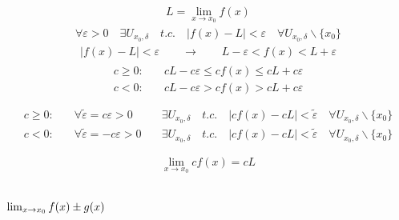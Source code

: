 \documentclass[letterpaper,10pt,italian]{jupyterBook}
\begin{document}
\begin{equation*}
\begin{split}L = \lim_{x \rightarrow x_0} f(x)\end{split}
\end{equation*}\begin{equation*}
\begin{split}\forall \varepsilon > 0 \quad \exists U_{x_0,\delta} \quad t.c. \quad |f(x) - L| < \varepsilon \quad \forall U_{x_0,\delta} \backslash \{x_0\} \end{split}
\end{equation*}\begin{equation*}
\begin{split}|f(x) - L| < \varepsilon \qquad \rightarrow \qquad L - \varepsilon < f(x) < L + \varepsilon\end{split}
\end{equation*}\begin{equation*}
\begin{split}\begin{aligned}
c \ge 0: & \quad  c L - c \varepsilon \le c f(x) \le c L + c \varepsilon \\
c  <  0: & \quad  c L - c \varepsilon   > c f(x)   > c L + c \varepsilon \\
\end{aligned}\end{split}
\end{equation*}\begin{equation*}
\begin{split}\begin{aligned}
c \ge 0: & \quad \forall \tilde{\varepsilon} =  c \varepsilon > 0 \quad & \exists U_{x_0,\delta} \quad t.c. \quad |c f(x) - c L| < \tilde{\varepsilon} \quad \forall U_{x_0,\delta} \backslash \{x_0\} \\
c <   0: & \quad \forall \tilde{\varepsilon} = -c \varepsilon > 0 \quad & \exists U_{x_0,\delta} \quad t.c. \quad |c f(x) - c L| < \tilde{\varepsilon} \quad \forall U_{x_0,\delta} \backslash \{x_0\} \\
\end{aligned}\end{split}
\end{equation*}\begin{equation*}
\begin{split}\begin{aligned}
 \lim_{x\rightarrow x_0} c f(x) = c L
\end{aligned}\end{split}
\end{equation*}\subsubsection*{\protect\(\lim_{x \rightarrow x_0} f(x) \pm g(x)\protect\)}
\end{document}
